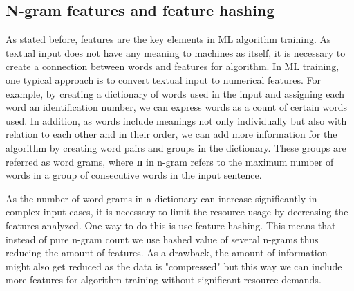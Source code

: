 

\subsection{N-gram features and feature hashing}\label{subsec:bg-ngram-features}

As stated before, %
features are the key elements in ML algorithm training.
As textual input does not have any meaning to machines as itself,
it is necessary to create a connection between words and features for algorithm.
In ML training, one typical approach is to convert textual input to numerical features.
For example, by creating a dictionary of words used in the input
and assigning each word an identification number,
we can express words as a count of certain words used.
In addition,
as words include meanings not only individually but also
with relation to each other and in their order, %
we can add more information for the algorithm
by creating word pairs and groups in the dictionary.
These groups are referred as word grams,
where \textbf{n} in n-gram refers to the maximum number of words
in a group of consecutive words in the input sentence.



As the number of word grams in a dictionary can increase significantly
in complex input cases,
it is necessary to limit the resource usage by decreasing the features analyzed.
One way to do this is use feature hashing.
This means that instead of pure n-gram count
we use hashed value of several n-grams
thus reducing the amount of features.
As a drawback,
the amount of information might also get reduced as the data is "compressed"
but this way we can include more features for algorithm training
without significant resource demands.


